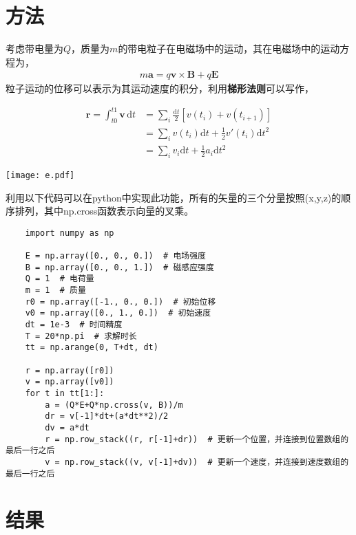 \documentclass{article} %
\renewcommand{\vec}[1]{\boldsymbol{#1}} %
\begin{document}
\section{方法}
考虑带电量为$Q$，质量为$m$的带电粒子在电磁场中的运动，其在电磁场中的运动方程为，
\begin{align}
    m\vec{a}=q \vec{v} \times \vec{B}+q \vec{E}
\end{align}
粒子运动的位移可以表示为其运动速度的积分，利用\textbf{梯形法则}可以写作，

\begin{minipage}[c]{0.5\linewidth}
    \begin{align}
        \vec{r}=\int_{t0}^{t1} \vec{v} \, \mathrm{d}t&=\sum_i \frac{\mathrm{d}t}{2}[v(t_i)+v(t_{i+1})]\\
        &=\sum_i v(t_i)\mathrm{d}t +\frac{1}{2} v'(t_i) \mathrm{d}t^2\\
        &=\sum_i v_i \mathrm{d}t +\frac{1}{2} a_i \mathrm{d}t^2
    \end{align}
\end{minipage}
\begin{minipage}[c]{0.4\linewidth}
    \texttt{[image: e.pdf]}
\end{minipage}

利用以下代码可以在python中实现此功能，所有的矢量的三个分量按照(x,y,z)的顺序排列，其中np.cross函数表示向量的叉乘。
\begin{lstlisting}
    import numpy as np
    
    E = np.array([0., 0., 0.])  # 电场强度
    B = np.array([0., 0., 1.])  # 磁感应强度
    Q = 1  # 电荷量
    m = 1  # 质量
    r0 = np.array([-1., 0., 0.])  # 初始位移
    v0 = np.array([0., 1., 0.])  # 初始速度
    dt = 1e-3  # 时间精度
    T = 20*np.pi  # 求解时长
    tt = np.arange(0, T+dt, dt)
    
    r = np.array([r0])
    v = np.array([v0])
    for t in tt[1:]:
        a = (Q*E+Q*np.cross(v, B))/m
        dr = v[-1]*dt+(a*dt**2)/2
        dv = a*dt
        r = np.row_stack((r, r[-1]+dr))  # 更新一个位置，并连接到位置数组的最后一行之后
        v = np.row_stack((v, v[-1]+dv))  # 更新一个速度，并连接到速度数组的最后一行之后
    \end{lstlisting}

\section{结果}
\end{document}
